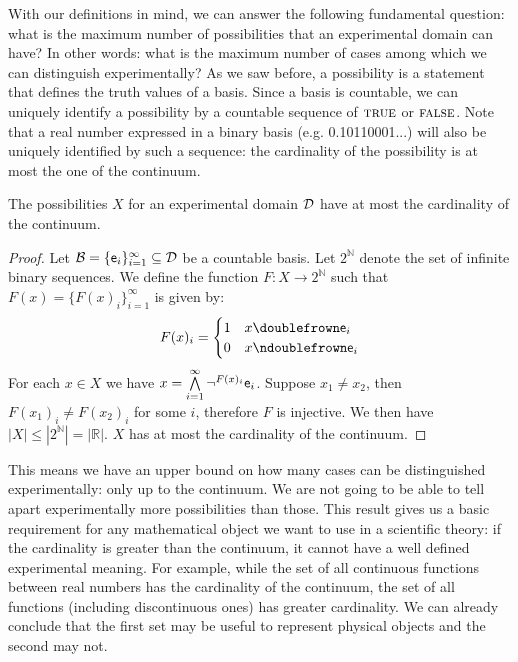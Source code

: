 \documentclass[11pt,letterpaper,fleqn]{memoir} %
\begin{document}
With our definitions in mind, we can answer the following fundamental question: what is the maximum number of possibilities that an experimental domain can have? In other words: what is the maximum number of cases among which we can distinguish experimentally? As we saw before, a possibility is a statement that defines the truth values of a basis. Since a basis is countable, we can uniquely identify a possibility by a countable sequence of $\TRUE$ or $\FALSE$. Note that a real number expressed in a binary basis (e.g. 0.10110001...) will also be uniquely identified by such a sequence: the cardinality of the possibility is at most the one of the continuum.

\begin{mathSection}
	\begin{thrm}
		The possibilities $X$ for an experimental domain $\edomain$ have at most the cardinality of the continuum.
	\end{thrm}
	
	\begin{proof}
		Let $\basis = \{\obs[e]_i\}_{i=1}^{\infty} \subseteq \edomain$ be a countable basis. Let $2^{\mathbb{N}}$ denote the set of infinite binary sequences. We define the function $F:X\to2^{\mathbb{N}}$ such that $F(x) = \{F(x)_i\}_{i=1}^{\infty}$ is given by: 
		$$
		F(x)_i = 
		\begin{cases}
		1 & x \comp \obs[e]_i \\
		0 & x \ncomp \obs[e]_i
		\end{cases}
		$$
		For each $x \in X$ we have $x = \bigAND\limits_{i=1}^{\infty} \NOT^{F(x)_i} \obs[e]_i$. Suppose $x_1 \neq x_2$, then $F(x_1)_i \neq F(x_2)_i$ for some $i$, therefore $F$ is injective. We then have $|X| \leq |2^{\mathbb{N}}|=|\mathbb{R}|$. $X$ has at most the cardinality of the continuum.
	\end{proof}
\end{mathSection}

This means we have an upper bound on how many cases can be distinguished experimentally: only up to the continuum. We are not going to be able to tell apart experimentally more possibilities than those. This result gives us a basic requirement for any mathematical object we want to use in a scientific theory: if the cardinality is greater than the continuum, it cannot have a well defined experimental meaning. For example, while the set of all continuous functions between real numbers has the cardinality of the continuum, the set of all functions (including discontinuous ones) has greater cardinality. We can already conclude that the first set may be useful to represent physical objects and the second may not.
\end{document}
